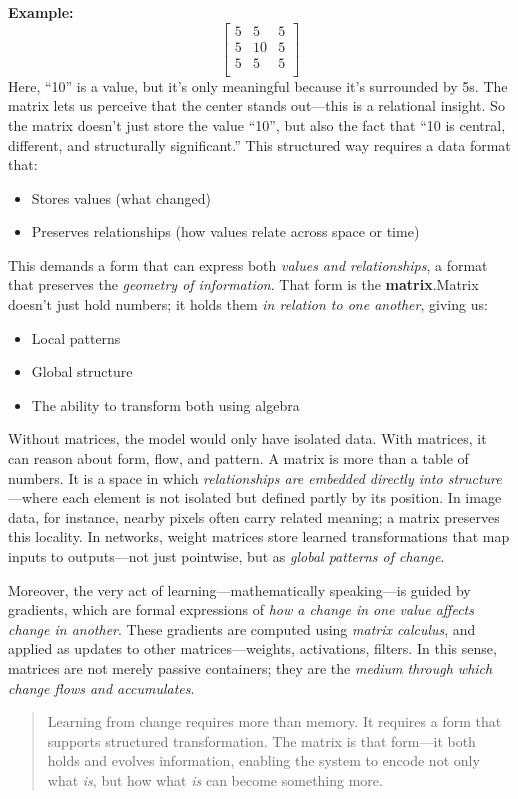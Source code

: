 \textbf{Example:}
\[
\begin{bmatrix}
	5 & 5 & 5 \\
	5 & 10 & 5 \\
	5 & 5 & 5 \\
\end{bmatrix}
\]
Here, “10” is a value, but it's only meaningful because it’s surrounded by 5s.  
The matrix lets us perceive that the center stands out—this is a relational insight. So the matrix doesn't just store the value “10”, but also the fact that “10 is central, different, and structurally significant.” This structured way requires a data format that:
\begin{itemize}
	\item Stores values (what changed)
	\item Preserves relationships (how values relate across space or time)
\end{itemize}
This demands a form that can express both \textit{values and relationships}, a format that preserves the \textit{geometry of information}. That form is the \textbf{matrix}.Matrix doesn’t just hold numbers; it holds them \textit{in relation to one another}, giving us:
\begin{itemize}
	\item Local patterns
	\item Global structure
	\item The ability to transform both using algebra
\end{itemize}
Without matrices, the model would only have isolated data. With matrices, it can reason about form, flow, and pattern. A matrix is more than a table of numbers. It is a space in which \textit{relationships are embedded directly into structure}—where each element is not isolated but defined partly by its position. In image data, for instance, nearby pixels often carry related meaning; a matrix preserves this locality. In networks, weight matrices store learned transformations that map inputs to outputs—not just pointwise, but as \textit{global patterns of change}.

Moreover, the very act of learning—mathematically speaking—is guided by gradients, which are formal expressions of \textit{how a change in one value affects change in another}. These gradients are computed using \textit{matrix calculus}, and applied as updates to other matrices—weights, activations, filters. In this sense, matrices are not merely passive containers; they are the \textit{medium through which change flows and accumulates}.
\begin{quote}
	Learning from change requires more than memory. It requires a form that supports structured transformation. The matrix is that form—it both holds and evolves information, enabling the system to encode not only what \textit{is}, but how what \textit{is} can become something more.
\end{quote}

